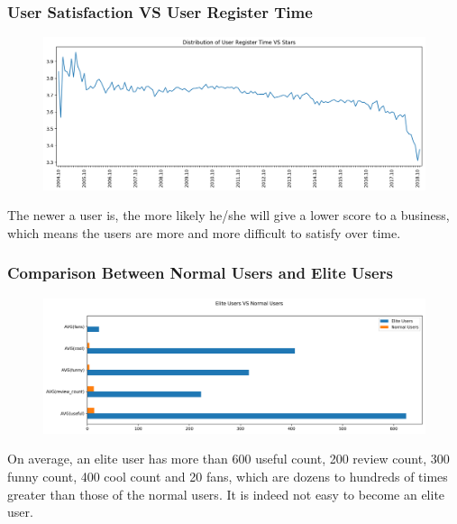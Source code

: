 \documentclass[12pt]{article}
\begin{document}
\subsubsection{User Satisfaction VS User Register Time}
\begin{figure}[H]
\begin{center}
    \includegraphics[width=1.0\textwidth]{../05_dataMining/distributionUserRegisterTimeStars.png}
\end{center}
\end{figure}
The newer a user is, the more likely he/she will give a lower score to a business, which means the users are more and more difficult to satisfy over time.

\subsubsection{Comparison Between Normal Users and Elite Users}
\begin{figure}[H]
\begin{center}
    \includegraphics[width=1.0\textwidth]{../05_dataMining/eliteVSNormalUsers.png}
\end{center}
\end{figure}
On average, an elite user has more than 600 useful count, 200 review count, 300 funny count, 400 cool count and 20 fans, which are dozens to hundreds of times greater than those of the normal users. It is indeed not easy to become an elite user.
\end{document}
